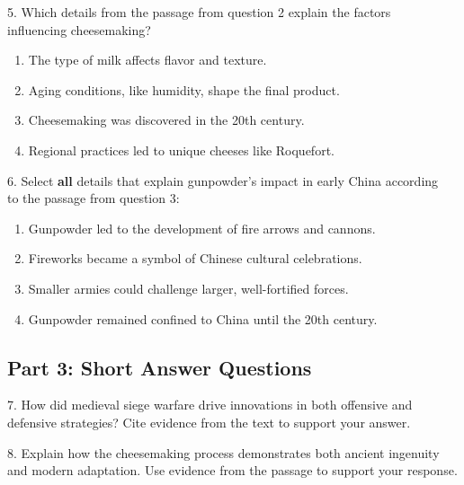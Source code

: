 \documentclass[12pt]{article}
\begin{document}
\vspace{1cm}

5. Which details from the passage from question 2 explain the factors \\influencing cheesemaking?\\  
\begin{enumerate}[label=\Alph*.]
    \item The type of milk affects flavor and texture.  
    \item Aging conditions, like humidity, shape the final product.  
    \item Cheesemaking was discovered in the 20th century.  
    \item Regional practices led to unique cheeses like Roquefort.  
\end{enumerate}

\vspace{1cm}

6. Select \textbf{all} details that explain gunpowder’s impact in early China according \\to the passage from question 3: \\  
\begin{enumerate}[label=\Alph*.]
    \item Gunpowder led to the development of fire arrows and cannons.  
    \item Fireworks became a symbol of Chinese cultural celebrations.  
    \item Smaller armies could challenge larger, well-fortified forces.  
    \item Gunpowder remained confined to China until the 20th century.  
\end{enumerate}

\vspace{1cm}

\subsection*{Part 3: Short Answer Questions}

7. How did medieval siege warfare drive innovations in both offensive and defensive strategies? Cite evidence from the text to support your answer.  
\vspace{4cm}

8. Explain how the cheesemaking process demonstrates both ancient ingenuity and modern adaptation. Use evidence from the passage to support your response.  
\vspace{4cm}
\end{document}
